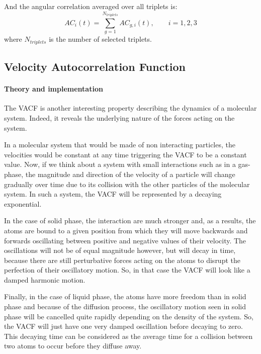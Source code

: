 \documentclass[a4paper,11pt]{article}
\begin{document}
And the angular correlation averaged over all triplets is:
\begin{equation}
\label{eq:ac}
AC_i(t) = \sum\limits_{g=1}^{N_{triplets}} AC_{g,i}(t), \qquad  i = 1,2,3
\end{equation}
where $N_{triplets}$ is the number of selected triplets.

\subsection{Velocity Autocorrelation Function}
\label{vacf}
\paragraph{Theory and implementation\\}
\label{vacf_theory}
The \gls{VACF} is another interesting property describing the dynamics of a
molecular system. Indeed, it reveals the underlying nature of the forces acting on the system.

In a molecular system that would be made of non interacting particles, the velocities would be constant at
any time triggering the \gls{VACF} to be a constant value. Now, if we think about a system with small interactions such as in a
gas-phase, the magnitude and direction of the velocity of a particle will change gradually over time due to its
collision with the other particles of the molecular system. In such a system, the \gls{VACF} will be represented by a
decaying exponential.

In the case of solid phase, the interaction are much stronger and, as a results, the atoms are bound to a given
position from which they will move backwards and forwards oscillating between positive and negative values of
their velocity. The oscillations will not be of equal magnitude however, but will decay in time, because there
are still perturbative forces acting on the atoms to disrupt the perfection of their oscillatory motion. So, in
that case the \gls{VACF} will look like a damped harmonic motion.

Finally, in the case of liquid phase, the atoms have more freedom than in solid phase and because of the diffusion
process, the oscillatory motion seen in solid phase will be cancelled quite rapidly depending on the density of the
system. So, the \gls{VACF} will just have one very damped oscillation before decaying to zero. This decaying time can be
considered as the average time for a collision between two atoms to occur before they diffuse away.
\end{document}
